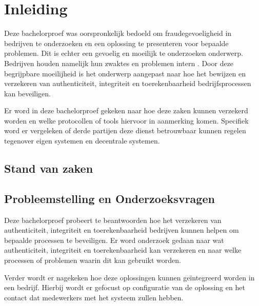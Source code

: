 
\chapter{Inleiding}
\label{ch:inleiding}

Deze bachelorproef was oorspronkelijk bedoeld om fraudegevoeligheid in bedrijven
te onderzoeken en een oplossing te presenteren voor bepaalde problemen. Dit is
echter een gevoelig en moeilijk te onderzoeken onderwerp. Bedrijven houden
namelijk hun zwaktes en problemen intern \autocite{EconomicCrimeSurvey}. Door
deze begrijpbare moeilijheid is het onderwerp aangepast naar hoe het bewijzen en
verzekeren van authenticiteit, integriteit en toerekenbaarheid bedrijfsprocessen
kan beveiligen.

Er word in deze bachelorproef gekeken naar hoe deze zaken kunnen verzekerd
worden en welke protocollen of tools hiervoor in aanmerking komen. Specifiek
word er vergeleken of derde partijen deze dienst betrouwbaar kunnen regelen
tegenover eigen systemen en decentrale systemen.

\section{Stand van zaken}
\label{sec:stand-van-zaken}




\section{Probleemstelling en Onderzoeksvragen}
\label{sec:onderzoeksvragen}

Deze bachelorproef probeert te beantwoorden hoe het verzekeren van
authenticiteit, integriteit en toerekenbaarheid bedrijven kunnen helpen om
bepaalde processen te beveiligen. Er word onderzoek gedaan naar wat
authenticiteit, integriteit en toerekenbaarheid kan verzekeren en naar welke
processen of problemen waarin dit kan gebruikt worden.

Verder wordt er nagekeken hoe deze oplossingen kunnen geïntegreerd worden in een
bedrijf. Hierbij wordt er gefocust op configuratie van de oplossing en het
contact dat medewerkers met het systeem zullen hebben.

